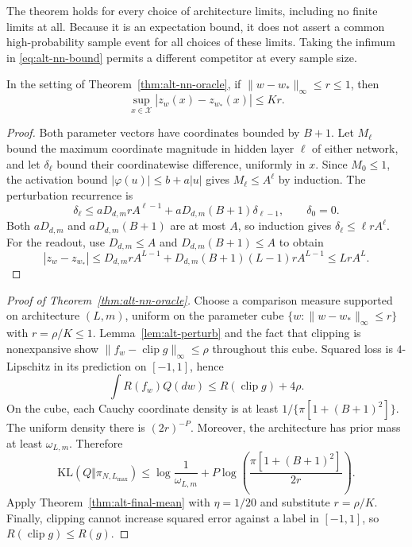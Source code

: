 The theorem holds for every choice of architecture limits, including
no finite limits at all.  Because it is an expectation bound, it does
not assert a common high-probability sample event for all choices of
these limits.  Taking the infimum in \eqref{eq:alt-nn-bound} permits a
different competitor at every sample size.

\begin{lemma}
\label{lem:alt-perturb}
In the setting of Theorem~\ref{thm:alt-nn-oracle}, if
$\|w-w_*\|_\infty\le r\le1$, then
\[
 \sup_{x\in\mathcal X}|z_w(x)-z_{w_*}(x)|\le K r.
\]
\end{lemma}

\begin{proof}
Both parameter vectors have coordinates bounded by $B+1$.
Let $M_\ell$ bound the maximum coordinate magnitude in hidden layer
$\ell$ of either network, and let $\delta_\ell$ bound their coordinatewise
difference, uniformly in $x$.  Since $M_0\le1$, the activation bound
$|\varphi(u)|\le b+a|u|$ gives $M_\ell\le A^\ell$ by induction.
The perturbation recurrence is
\[
 \delta_\ell\le aD_{d,m}r A^{\ell-1}
                    +aD_{d,m}(B+1)\delta_{\ell-1},
 \qquad \delta_0=0.
\]
Both $aD_{d,m}$ and $aD_{d,m}(B+1)$ are at most $A$, so induction gives
$\delta_\ell\le \ell r A^\ell$.
For the readout, use $D_{d,m}\le A$ and $D_{d,m}(B+1)\le A$ to obtain
\[
 |z_w-z_{w_*}|
 \le D_{d,m}r A^{L-1}+D_{d,m}(B+1)(L-1)r A^{L-1}
 \le LrA^L.
\]
\end{proof}

\begin{proof}[Proof of Theorem~\ref{thm:alt-nn-oracle}]
Choose a comparison measure supported on architecture $(L,m)$, uniform
on the parameter cube
$\{w:\|w-w_*\|_\infty\le r\}$ with $r=\rho/K\le1$.
Lemma~\ref{lem:alt-perturb} and the fact that clipping is nonexpansive
show $\|f_w-\operatorname{clip}g\|_\infty\le\rho$ throughout this cube.
Squared loss is $4$-Lipschitz in its prediction on $[-1,1]$, hence
\[
 \int R(f_w)Q(dw)\le R(\operatorname{clip}g)+4\rho.
\]
On the cube, each Cauchy coordinate density is at least
$1/\{\pi[1+(B+1)^2]\}$.  The uniform density there is $(2r)^{-P}$.
Moreover, the architecture has prior mass at least $\omega_{L,m}$.
Therefore
\[
 \mathrm{KL}(Q\Vert\pi_{N,L_{\max}})
 \le \log\frac1{\omega_{L,m}}
       +P\log\left(\frac{\pi[1+(B+1)^2]}{2r}\right).
\]
Apply Theorem~\ref{thm:alt-final-mean} with $\eta=1/20$ and substitute
$r=\rho/K$.  Finally, clipping cannot increase squared error against a
label in $[-1,1]$, so $R(\operatorname{clip}g)\le R(g)$.
\end{proof}

